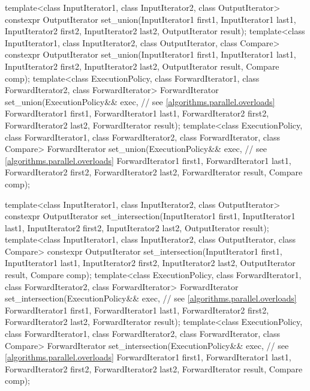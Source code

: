 \begin{codeblock}
{  template<class InputIterator1, class InputIterator2, class OutputIterator>
    constexpr OutputIterator
      set_union(InputIterator1 first1, InputIterator1 last1,
                InputIterator2 first2, InputIterator2 last2,
                OutputIterator result);
  template<class InputIterator1, class InputIterator2, class OutputIterator, class Compare>
    constexpr OutputIterator
                set_union(InputIterator1 first1, InputIterator1 last1,
                InputIterator2 first2, InputIterator2 last2,
                OutputIterator result, Compare comp);
  template<class ExecutionPolicy, class ForwardIterator1, class ForwardIterator2,
           class ForwardIterator>
    ForwardIterator
      set_union(ExecutionPolicy&& exec, // see \ref{algorithms.parallel.overloads}
                ForwardIterator1 first1, ForwardIterator1 last1,
                ForwardIterator2 first2, ForwardIterator2 last2,
                ForwardIterator result);
  template<class ExecutionPolicy, class ForwardIterator1, class ForwardIterator2,
           class ForwardIterator, class Compare>
    ForwardIterator
      set_union(ExecutionPolicy&& exec, // see \ref{algorithms.parallel.overloads}
                ForwardIterator1 first1, ForwardIterator1 last1,
                ForwardIterator2 first2, ForwardIterator2 last2,
                ForwardIterator result, Compare comp);

  template<class InputIterator1, class InputIterator2, class OutputIterator>
    constexpr OutputIterator
      set_intersection(InputIterator1 first1, InputIterator1 last1,
                       InputIterator2 first2, InputIterator2 last2,
                       OutputIterator result);
  template<class InputIterator1, class InputIterator2, class OutputIterator, class Compare>
    constexpr OutputIterator
      set_intersection(InputIterator1 first1, InputIterator1 last1,
                       InputIterator2 first2, InputIterator2 last2,
                       OutputIterator result, Compare comp);
  template<class ExecutionPolicy, class ForwardIterator1, class ForwardIterator2,
           class ForwardIterator>
    ForwardIterator
      set_intersection(ExecutionPolicy&& exec, // see \ref{algorithms.parallel.overloads}
                       ForwardIterator1 first1, ForwardIterator1 last1,
                       ForwardIterator2 first2, ForwardIterator2 last2,
                       ForwardIterator result);
  template<class ExecutionPolicy, class ForwardIterator1, class ForwardIterator2,
           class ForwardIterator, class Compare>
    ForwardIterator
      set_intersection(ExecutionPolicy&& exec, // see \ref{algorithms.parallel.overloads}
                       ForwardIterator1 first1, ForwardIterator1 last1,
                       ForwardIterator2 first2, ForwardIterator2 last2,
                       ForwardIterator result, Compare comp);

}
\end{codeblock}
